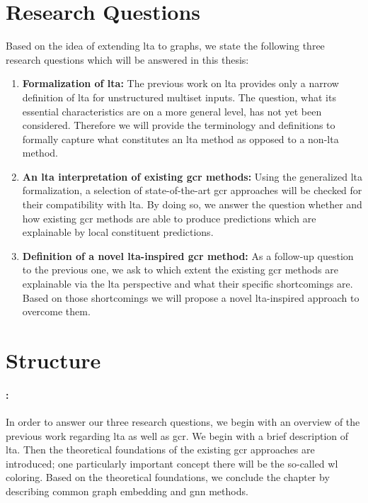 \section{Research Questions}%
\label{sec:intro:questions}

Based on the idea of extending \ac{lta} to graphs, we state the following three research questions which will be answered in this thesis:
\begin{enumerate}[label=\textbf{\arabic*.}]
	\item \textbf{Formalization of \ac{lta}:}
		The previous work on \ac{lta} provides only a narrow definition of \ac{lta} for unstructured multiset inputs.
		The question, what its essential characteristics are on a more general level, has not yet been considered.
		Therefore we will provide the terminology and definitions to formally capture what constitutes an \ac{lta} method as opposed to a non-\ac{lta} method.
	\item \textbf{An \ac{lta} interpretation of existing \ac{gcr} methods:}
		Using the generalized \ac{lta} formalization, a selection of state-of-the-art \ac{gcr} approaches will be checked for their compatibility with \ac{lta}.
		By doing so, we answer the question whether and how existing \ac{gcr} methods are able to produce predictions which are explainable by local constituent predictions.
	\item \textbf{Definition of a novel \acs{lta}-inspired \ac{gcr} method:}
		As a follow-up question to the previous one, we ask to which extent the existing \ac{gcr} methods are explainable via the \ac{lta} perspective and what their specific shortcomings are.
		Based on those shortcomings we will propose a novel \acs{lta}-inspired approach to overcome them.
\end{enumerate}

\section{Structure}%
\label{sec:intro:structure}

\paragraph{: }
In order to answer our three research questions, we begin with an overview of the previous work regarding \ac{lta} as well as \ac{gcr}.
We begin with a brief description of \ac{lta}.
Then the theoretical foundations of the existing \ac{gcr} approaches are introduced;
one particularly important concept there will be the so-called \acl*{wl} coloring.
Based on the theoretical foundations, we conclude the chapter by describing common graph embedding and \acl{gnn} methods.

